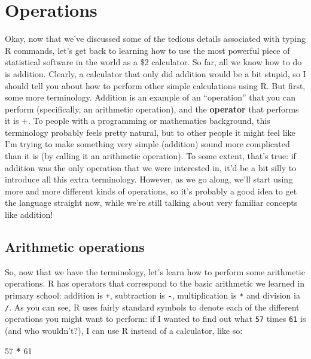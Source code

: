 \documentclass[]{book}
\newenvironment{Shaded}{\begin{snugshade}}{\end{snugshade}}
\newcommand{\DecValTok}[1]{\textcolor[rgb]{0.00,0.00,0.81}{#1}}
\newcommand{\OperatorTok}[1]{\textcolor[rgb]{0.81,0.36,0.00}{\textbf{#1}}}
\newcommand{\StringTok}[1]{\textcolor[rgb]{0.31,0.60,0.02}{#1}}
\begin{document}
\hypertarget{operations}{%
\section{Operations}\label{operations}}

Okay, now that we've discussed some of the tedious details associated with typing R commands, let's get back to learning how to use the most powerful piece of statistical software in the world as a \$2 calculator. So far, all we know how to do is addition. Clearly, a calculator that only did addition would be a bit stupid, so I should tell you about how to perform other simple calculations using R. But first, some more terminology. Addition is an example of an ``operation'' that you can perform (specifically, an arithmetic operation), and the \textbf{operator} that performs it is +. To people with a programming or mathematics background, this terminology probably feels pretty natural, but to other people it might feel like I'm trying to make something very simple (addition) sound more complicated than it is (by calling it an arithmetic operation). To some extent, that's true: if addition was the only operation that we were interested in, it'd be a bit silly to introduce all this extra terminology. However, as we go along, we'll start using more and more different kinds of operations, so it's probably a good idea to get the language straight now, while we're still talking about very familiar concepts like addition!

\hypertarget{arithmetic-operations}{%
\subsection{Arithmetic operations}\label{arithmetic-operations}}

So, now that we have the terminology, let's learn how to perform some arithmetic operations. R has operators that correspond to the basic arithmetic we learned in primary school: addition is \texttt{+}, subtraction is \texttt{-}, multiplication is \texttt{*} and division ia \texttt{/}. As you can see, R uses fairly standard symbols to denote each of the different operations you might want to perform: if I wanted to find out what \texttt{57} times \texttt{61} is (and who wouldn't?), I can use R instead of a calculator, like so:

\begin{Shaded}
\begin{Highlighting}[]
\DecValTok{57} \OperatorTok{*}\StringTok{ }\DecValTok{61}
\end{Highlighting}
\end{Shaded}
\end{document}
